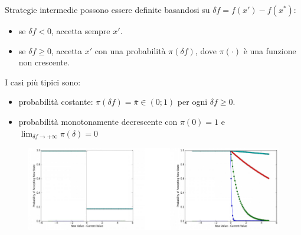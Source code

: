 \documentclass{article}
\begin{document}
Strategie intermedie possono essere definite basandosi su $\delta f =f(x')-f(x^*)$:
\begin{itemize}
    \item se $\delta f<0$, accetta sempre $x'$.
    \item se $\delta f\geq 0$, accetta $x'$ con una probabilità $\pi(\delta f)$, dove
    $\pi(\cdot)$ è una funzione non crescente.
\end{itemize}
I casi più tipici sono:
\begin{itemize}
    \item probabilità costante: $\pi(\delta f)=\overline{\pi}\in(0;1)$ per ogni $\delta f\geq 0$.
    \item probabilità monotonamente decrescente con $\pi(0)=1$ e $\lim_{\delta f\rightarrow+\infty}\pi(\delta)=0$
\end{itemize}
\begin{figure}[H]
    \centering
    \includegraphics[scale=0.6]{images/acceptcond.png}
\end{figure}
\end{document}
